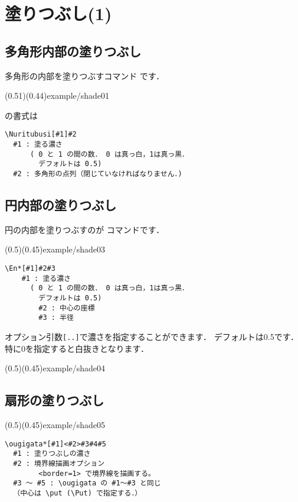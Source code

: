 \section{塗りつぶし(1)}
\subsection{多角形内部の塗りつぶし}
多角形の内部を塗りつぶすコマンド  です．

\showexample[多角形の塗りつぶし](0.51)(0.44){example/shade01}

 の書式は

\begin{boxnote}
\begin{verbatim}
\Nuritubusi[#1]#2
  #1 : 塗る濃さ 
      ( 0 と 1 の間の数． 0 は真っ白，1は真っ黒．
        デフォルトは 0.5)
  #2 : 多角形の点列（閉じていなければなりません．)
\end{verbatim}
\end{boxnote}

\subsection{円内部の塗りつぶし}
円の内部を塗りつぶすのが  コマンドです．

\showexample[円の塗りつぶし](0.5)(0.45){example/shade03}

\begin{boxnote}
\begin{verbatim}
\En*[#1]#2#3
    #1 : 塗る濃さ 
      ( 0 と 1 の間の数． 0 は真っ白，1は真っ黒．
        デフォルトは 0.5)
        #2 : 中心の座標
        #3 : 半径
\end{verbatim}
\end{boxnote}

オプション引数\texttt{[..]}で濃さを指定することができます．
デフォルトは0.5です．特に0を指定すると白抜きとなります．

\showexample[白抜き](0.5)(0.45){example/shade04}

\subsection{扇形の塗りつぶし}
\showexample[扇形の塗りつぶし](0.5)(0.45){example/shade05}

\begin{boxnote}
\begin{verbatim}
\ougigata*[#1]<#2>#3#4#5
  #1 : 塗りつぶしの濃さ
  #2 : 境界線描画オプション
        <border=1> で境界線を描画する。
  #3 〜 #5 : \ougigata の #1〜#3 と同じ
  （中心は \put (\Put) で指定する．）
\end{verbatim}
\end{boxnote}

